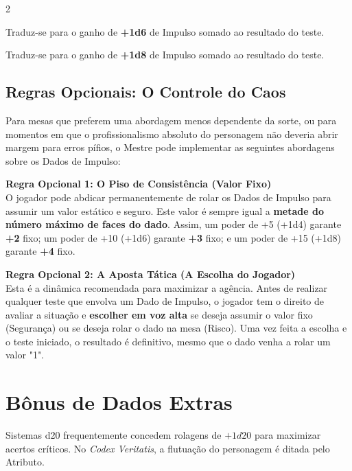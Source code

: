 \documentclass[a4paper,11pt,openany]{book}
\begin{document}
\begin{multicols}{2}
\begin{description}[font=\sffamily\bfseries\color{CodexRed}]
    \item[Bônus de +10:] Traduz-se para o ganho de \textbf{+1d6} de Impulso somado ao resultado do teste.
    
    \item[Bônus de +15:] Traduz-se para o ganho de \textbf{+1d8} de Impulso somado ao resultado do teste.
\end{description}

\subsection{Regras Opcionais: O Controle do Caos}

Para mesas que preferem uma abordagem menos dependente da sorte, ou para momentos em que o profissionalismo absoluto do personagem não deveria abrir margem para erros pífios, o Mestre pode implementar as seguintes abordagens sobre os Dados de Impulso:

\begin{regra}
\textbf{Regra Opcional 1: O Piso de Consistência (Valor Fixo)} \\
O jogador pode abdicar permanentemente de rolar os Dados de Impulso para assumir um valor estático e seguro. Este valor é sempre igual a \textbf{metade do número máximo de faces do dado}. Assim, um poder de +5 (+1d4) garante \textbf{+2} fixo; um poder de +10 (+1d6) garante \textbf{+3} fixo; e um poder de +15 (+1d8) garante \textbf{+4} fixo.
\end{regra}

\begin{regra}
\textbf{Regra Opcional 2: A Aposta Tática (A Escolha do Jogador)} \\
Esta é a dinâmica recomendada para maximizar a agência. Antes de realizar qualquer teste que envolva um Dado de Impulso, o jogador tem o direito de avaliar a situação e \textbf{escolher em voz alta} se deseja assumir o valor fixo (Segurança) ou se deseja rolar o dado na mesa (Risco). Uma vez feita a escolha e o teste iniciado, o resultado é definitivo, mesmo que o dado venha a rolar um valor "1".
\end{regra}
\section{Bônus de Dados Extras}

Sistemas d20 frequentemente concedem rolagens de $+1d20$ para maximizar acertos críticos. No \textit{Codex Veritatis}, a flutuação do personagem é ditada pelo Atributo.


\end{multicols}
\end{document}
